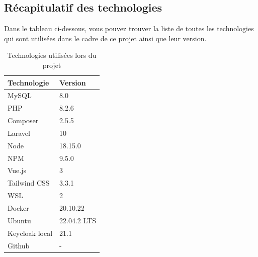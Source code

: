 \subsection{Récapitulatif des technologies}
Dans le tableau ci-dessous, vous pouvez trouver la liste de toutes les technologies qui sont utilisées dans le cadre de ce projet ainsi que leur version.
\begin{table}[h]
    \begin{center}
        \caption{Technologies utilisées lors du projet \label{stack}}
        \begin{tabular}{|l|l|}
            \hline
            \textbf{Technologie} & \textbf{Version} \\
            \hline
            MySQL                & 8.0              \\
            \hline
            PHP                  & 8.2.6            \\
            \hline
            Composer             & 2.5.5            \\
            \hline
            Laravel              & 10               \\
            \hline
            Node                 & 18.15.0          \\
            \hline
            NPM                  & 9.5.0            \\
            \hline
            Vue.js               & 3                \\
            \hline
            Tailwind CSS         & 3.3.1            \\
            \hline
            WSL                  & 2                \\
            \hline
            Docker               & 20.10.22         \\
            \hline
            Ubuntu               & 22.04.2 LTS      \\
            \hline
            Keycloak local       & 21.1             \\
            \hline
            Github               & -                \\
            \hline
        \end{tabular}
    \end{center}
\end{table}